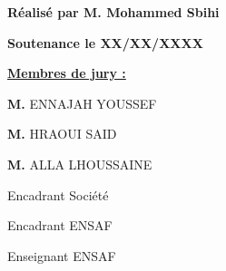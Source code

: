 \documentclass[12pt,a4paper,twoside]{report}
\begin{document}
\begin{titlepage}
  \noindent\colorbox{zlightOrange!30}{%
    \parbox{\dimexpr\textwidth-2\fboxsep\relax}{%
      \vspace{1cm}
      \centering
      {\large\bfseries R\'ealis\'e par M. Mohammed Sbihi\par}
      \vspace{0.35cm}
      {\large\bfseries Soutenance le XX/XX/XXXX\par}
      \vspace{0.75cm}
      \begin{minipage}{0.46\textwidth}
        \hspace{0.5cm}
     \hspace{2cm}   \underline{\textbf{Membres de jury :}}\par
        \vspace{0.45cm}
      \hspace{2cm}  \textbf{M.} ENNAJAH YOUSSEF\par
      \hspace{2cm}  \textbf{M.} HRAOUI SAID\par
     \hspace{2cm}   \textbf{M.} ALLA LHOUSSAINE\par
      \end{minipage}%
      \hfill
      \begin{minipage}{0.46\textwidth}
                \vspace{1cm}

        Encadrant Soci\'et\'e\par
        Encadrant ENSAF\par
        Enseignant ENSAF\par
      \end{minipage}
      \vspace{1.75cm}
    }%
  }
\end{titlepage}
\restoregeometry

\setcounter{page}{1}








\clearpage
\setcounter{tocdepth}{1}
\setcounter{secnumdepth}{3}
\tableofcontents
\clearpage

\listoffigures
\clearpage

\listoftables
\clearpage
\end{document}
